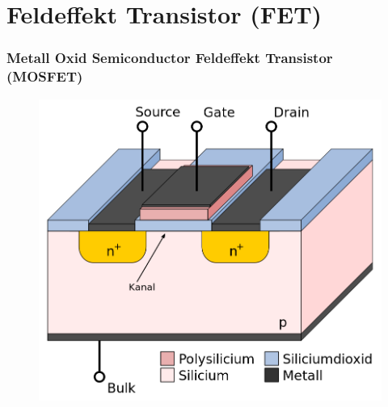 \section*{Feldeffekt Transistor (FET)}
\begin{frame}
\frametitle{Metall Oxid Semiconductor Feldeffekt Transistor (MOSFET)}
\begin{center}
	 \begin{figure}
      \includegraphics[width=\textwidth,height=.65\textheight,keepaspectratio]{e13/N-Kanal-MOSFET.png}
    \end{figure}
\end{center}
\end{frame}

